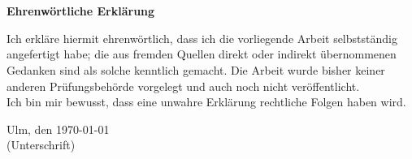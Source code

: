 
\thispagestyle{empty}

\chapter*{}
\thispagestyle{empty}
 \begin{center}
{\large\textbf{Ehrenwörtliche Erklärung} }
\end{center}

\vspace*{1cm}

\noindent
Ich erkläre hiermit ehrenwörtlich, dass ich die vorliegende Arbeit
selbstständig angefertigt habe; die aus fremden Quellen direkt oder indirekt 
übernommenen Gedanken sind als solche kenntlich gemacht. Die Arbeit wurde 
bisher keiner anderen Prüfungsbehörde vorgelegt und auch noch nicht 
veröffentlicht.\\

\noindent
Ich bin mir bewusst, dass eine unwahre Erklärung rechtliche Folgen haben wird.

\vspace{2cm}



\noindent Ulm, den \today \hspace{4cm}\hrulefill\\

\hspace*{8.5cm} (Unterschrift)



